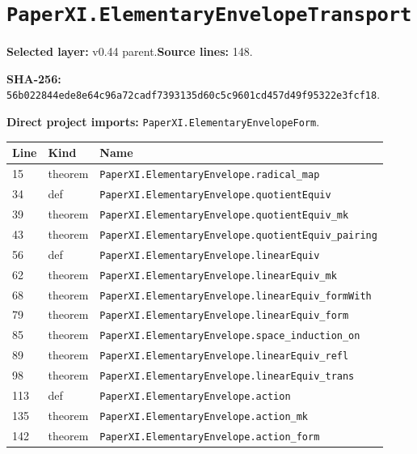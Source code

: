 \documentclass[10pt,oneside]{book}
\begin{document}
\section{\texorpdfstring{\nolinkurl{PaperXI.ElementaryEnvelopeTransport}}{PaperXI.ElementaryEnvelopeTransport}}\label{module:PaperXI.ElementaryEnvelopeTransport}

\textbf{Selected layer:} v0.44 parent.\quad\textbf{Source lines:} 148.\par\textbf{SHA-256:} {\scriptsize\nolinkurl{56b022844ede8e64c96a72cadf7393135d60c5c9601cd457d49f95322e3fcf18}}.


\textbf{Direct project imports:} \nolinkurl{PaperXI.ElementaryEnvelopeForm}.

\begin{longtable}{@{}p{}p{}p{}@{}}\toprule Line&Kind&Name\\\midrule\endhead

15&theorem&\nolinkurl{PaperXI.ElementaryEnvelope.radical_map}\\

34&def&\nolinkurl{PaperXI.ElementaryEnvelope.quotientEquiv}\\

39&theorem&\nolinkurl{PaperXI.ElementaryEnvelope.quotientEquiv_mk}\\

43&theorem&\nolinkurl{PaperXI.ElementaryEnvelope.quotientEquiv_pairing}\\

56&def&\nolinkurl{PaperXI.ElementaryEnvelope.linearEquiv}\\

62&theorem&\nolinkurl{PaperXI.ElementaryEnvelope.linearEquiv_mk}\\

68&theorem&\nolinkurl{PaperXI.ElementaryEnvelope.linearEquiv_formWith}\\

79&theorem&\nolinkurl{PaperXI.ElementaryEnvelope.linearEquiv_form}\\

85&theorem&\nolinkurl{PaperXI.ElementaryEnvelope.space_induction_on}\\

89&theorem&\nolinkurl{PaperXI.ElementaryEnvelope.linearEquiv_refl}\\

98&theorem&\nolinkurl{PaperXI.ElementaryEnvelope.linearEquiv_trans}\\

113&def&\nolinkurl{PaperXI.ElementaryEnvelope.action}\\

135&theorem&\nolinkurl{PaperXI.ElementaryEnvelope.action_mk}\\

142&theorem&\nolinkurl{PaperXI.ElementaryEnvelope.action_form}\\

\bottomrule\end{longtable}
\end{document}
